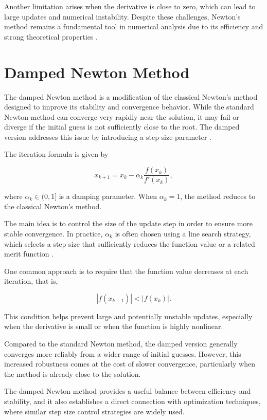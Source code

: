 Another limitation arises when the derivative is close to zero, which can lead to large updates and numerical instability. Despite these challenges, Newton's method remains a fundamental tool in numerical analysis due to its efficiency and strong theoretical properties \cite{chapra}.

\section{Damped Newton Method}

The damped Newton method is a modification of the classical Newton's method designed to improve its stability and convergence behavior. While the standard Newton method can converge very rapidly near the solution, it may fail or diverge if the initial guess is not sufficiently close to the root. The damped version addresses this issue by introducing a step size parameter \cite{kelley, chapra}.

The iteration formula is given by

\begin{equation}
x_{k+1} = x_k - \alpha_k \frac{f(x_k)}{f'(x_k)},
\end{equation}

where \( \alpha_k \in (0,1] \) is a damping parameter. When \( \alpha_k = 1 \), the method reduces to the classical Newton's method.

The main idea is to control the size of the update step in order to ensure more stable convergence. In practice, \( \alpha_k \) is often chosen using a line search strategy, which selects a step size that sufficiently reduces the function value or a related merit function \cite{kelley}.

One common approach is to require that the function value decreases at each iteration, that is,

\begin{equation}
|f(x_{k+1})| < |f(x_k)|.
\end{equation}

This condition helps prevent large and potentially unstable updates, especially when the derivative is small or when the function is highly nonlinear.

Compared to the standard Newton method, the damped version generally converges more reliably from a wider range of initial guesses. However, this increased robustness comes at the cost of slower convergence, particularly when the method is already close to the solution.

The damped Newton method provides a useful balance between efficiency and stability, and it also establishes a direct connection with optimization techniques, where similar step size control strategies are widely used.

